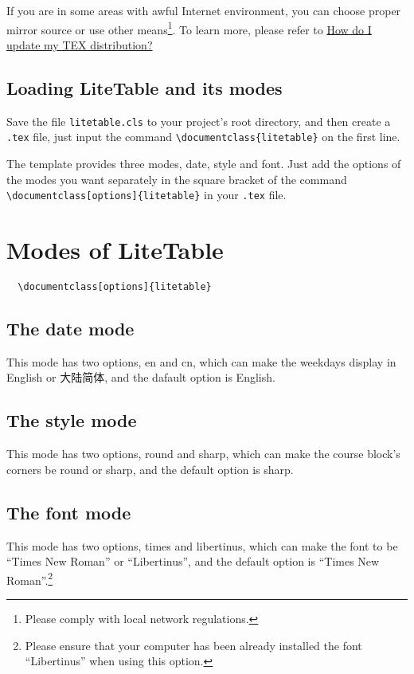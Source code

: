 \documentclass[11pt]{article}
\def\pkg#1{\texorpdfstring{\textcolor{pkgcolor}{\textsf{#1}}}{“#1”}}
\def\mode#1{\texorpdfstring{\textcolor{moducolor}{\textsf{#1}}}{“#1”}}
\begin{document}
If you are in some areas with awful Internet environment, you can choose proper mirror source or use other means\footnote{Please comply with local network regulations.}. To learn more, please refer to \href{https://tex.stackexchange.com/questions/55437/how-do-i-update-my-tex-distribution}{How do I update my TEX distribution?}

\subsection{Loading \pkg{LiteTable} and its modes}
Save the file \verb|litetable.cls| to your project's root directory, and then create a \verb|.tex| file, just input the command \verb|\documentclass{litetable}| on the first line.

The template provides three modes, \mode{date}, \mode{style} and \mode{font}. Just add the options of the modes you want separately in the square bracket of the command \verb|\documentclass[options]{litetable}| in your \verb|.tex| file.

\newpage
\section{Modes of \pkg{LiteTable}}
\begin{verbatim}
  \documentclass[options]{litetable}
\end{verbatim}
\subsection{The \mode{date} mode}
This mode has two options, \mode{en} and \mode{cn}, which can make the weekdays display in English or 大陆简体, and the dafault option is English.

\subsection{The \mode{style} mode}
This mode has two options, \mode{round} and \mode{sharp}, which can make the course block's corners be round or sharp, and the default option is sharp.

\subsection{The \mode{font} mode}
This mode has two options, \mode{times} and \mode{libertinus}, which can make the font to be ``Times New Roman'' or ``Libertinus'', and the default option is ``Times New Roman''.\footnote{Please ensure that your computer has been already installed the font ``Libertinus'' when using this option.}
\end{document}
